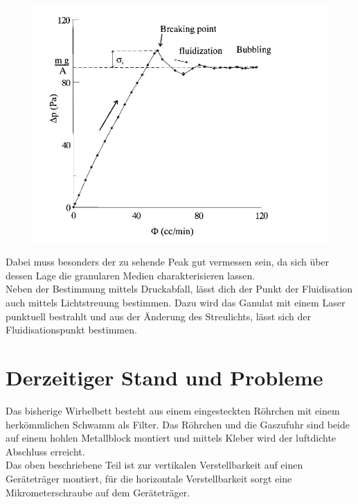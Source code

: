 \begin{figure}[h]
	\begin{center}
		\includegraphics[scale=0.5]{Castellanos_Diagramm.jpg}
		\caption{\cite{Castellanos2000}}
	\end{center}
\end{figure}

Dabei muss besonders der zu sehende Peak gut vermessen sein, da sich über dessen Lage die granularen Medien charakterisieren lassen. \\
Neben der Bestimmung mittels Druckabfall, lässt dich der Punkt der Fluidisation auch mittels Lichtstreuung bestimmen. Dazu wird das Ganulat mit einem Laser punktuell bestrahlt und aus der Änderung des Streulichts, lässt sich der Fluidisationspunkt bestimmen. 


\section{Derzeitiger Stand und Probleme}


Das bisherige Wirbelbett besteht aus einem eingesteckten Röhrchen mit einem herkömmlichen Schwamm als Filter. Das Röhrchen und die Gaszufuhr sind beide auf einem hohlen Metallblock montiert und mittels Kleber wird der luftdichte Abschluss erreicht. \\
Das oben beschriebene Teil ist zur vertikalen Verstellbarkeit auf einen Geräteträger montiert, für die horizontale Verstellbarkeit sorgt eine Mikrometerschraube auf dem Geräteträger. 

